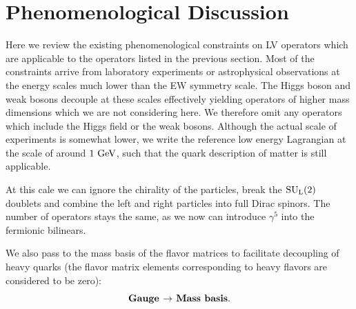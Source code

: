 \documentclass[12pt]{revtex4}
\newcommand{\sul}{{\rm SU}_{\rm L}(2)}
\newcommand{\GeV}{{\rm GeV}}
\begin{document}
%
%
\section{Phenomenological Discussion}
	
	Here we review the existing phenomenological constraints on 
	LV operators which are applicable to the operators listed in the
	previous section.
	Most of the constraints arrive from laboratory experiments
	or astrophysical observations at the energy scales much lower
	than the EW symmetry scale. 
	The Higgs boson and weak bosons decouple 
	at these scales effectively yielding operators of higher mass
	dimensions which we are not considering here.
	We therefore omit any operators which include the Higgs field or
	the weak bosons. 
	Although the actual scale of experiments is somewhat lower,
	we write the reference low energy Lagrangian at the scale of
	around $ 1~\GeV $, such that the quark description of matter is 
	still applicable.

	At this cale we can ignore the chirality of the particles, break the
	$ \sul $ doublets and combine the left and right particles into
	full Dirac spinors. 
	The number of operators stays the same, as we now can introduce
	$ \gamma^5 $ into the fermionic bilinears. 

	We also pass to the mass basis of the flavor matrices to facilitate
	decoupling of heavy quarks (the flavor matrix elements corresponding
	to heavy flavors are considered to be zero):
\[
\text{\bf Gauge $\rightarrow$ Mass basis}.
\]
	
\end{document}
